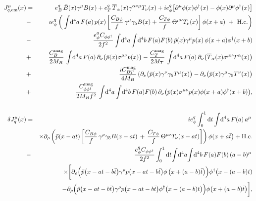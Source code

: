 \documentclass[preprintnumbers,prd,superscriptaddress,preprint]{revtex4-1}
\begin{document}
\begin{eqnarray}
\label{eq:Jem}
J_{q, \rm em}^\mu(x)
&=& e^q_B\,\bar{B}(x) \gamma^\mu B(x)
 +  e^q_T\, \overline{T}_\alpha(x) \gamma^{\alpha\nu\mu} T_\nu(x)
 +  ie^q_\phi \big[ \partial^\mu \phi(x) \phi^\dag(x)
                  - \phi(x) \partial^\mu \phi^\dag(x)
              \big]
\notag\\
&-& i e^q_\phi\,
\bigg(    \int\!\dd[4]{a} F(a)\, \bar{p}(x)
    \left[ \frac{C_{B\phi}}{f}\, \gamma^\mu \gamma_5 B(x)
	     + \frac{C_{T\phi}}{f}\, \Theta^{\mu\nu} T_\nu(x)
    \right] \phi(x+a)\ +\ {\rm H.c.}
\bigg)
\notag\\
&-& \frac{e^q_\phi C_{\phi\phi^\dag}}{2f^2}
    \int\!\dd[4]{a} \int\!\dd[4]{b} F(a) F(b)\,
    \bar{p}(x) \gamma^\mu p(x)\, \phi(x+a) \phi^\dag(x+b)
\notag\\
&+& \frac{C_B^{\rm mag}}{2 M_B}\, \int\!\dd[4]{a} F(a)\,
    \partial_\nu\big(\bar{p}(x) \sigma^{\mu\nu} p(x) \big)
 -  \frac{C_T^{\rm mag}}{2 M_T}\, \int\!\dd[4]{a} F(a)\,
    \partial_\nu\big(\overline {T}_\alpha(x) \sigma^{\mu\nu} T^\alpha(x) \big )
\notag\\
&+& \frac{i C_{BT}^{\rm mag}}{4 M_B}\, 
    ( \partial_\nu\big(\bar{p}(x) \gamma^\nu \gamma_5 T^\mu(x) \big)
    - \partial_\nu\big(\bar{p}(x) \gamma^\mu \gamma_5 T^\nu(x) \big)
\notag\\
&+& \frac{C_{\phi\phi^\dag}^{\rm mag}}{2 M_B f^2}\,
    \int\!\dd[4]{a} \int\!\dd[4]{b} F(a) F(b)\,
   \partial_\nu \big(\bar{p}(x) \sigma^{\mu\nu} p(x) \phi(x+a) \phi^\dag(x+b) \big),
\\
& &
\notag\\
%
%
\delta J_q^\mu(x)
&=& i e^q_\phi
    \int_0^1 \dd{t} \int\!\dd[4]{a} F(a)\, a^\mu\,
\notag\\
& & \times
    \partial_\rho 
    \left( \bar{p}(x-at)
    \left[ \frac{C_{B\phi}}{f}\, \gamma^\rho \gamma_5 B(x-at)\,
       +\, \frac{C_{T\phi}}{f}\, \Theta^{\rho\nu} T_\nu(x-at)
    \right]
    \right) \phi(x+a\bar{t}\big) + {\rm H.c.}
\notag\\
&-& \frac{e^q_\phi C_{\phi\phi^\dag}}{2f^2}
    \int_0^1 \dd{t}\!\int\!\dd[4]{a}\!\int\!\dd[4]{b} F(a) F(b)\, (a-b)^\mu\,
\notag\\
& & \times
\bigg[ 
    \partial_\rho
    \Big(
        \bar{p}\big(x-at-b\bar{t}\big) \gamma^\rho p\big(x-at-b\bar{t}\big)
    \phi\,\big(x+(a-b)\bar{t}\big)
    \Big)
    \phi^\dag\big(x-(a-b)t)
\notag\\
& & \hspace*{0.2cm}
 -  \partial_\rho
    \Big( 
        \bar{p}\big(x-at-b\bar{t}\big) \gamma^\rho p\big(x-at-b\bar{t}\big)
    \phi^\dag\big(x-(a-b)t\big)
	\Big)
    \phi\big(x+(a-b)\bar{t}\big)
\bigg],
\label{eq:Jlink}
\end{eqnarray}
\end{document}
